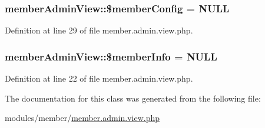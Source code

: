 \hypertarget{classmemberAdminView_acd19132e0c8fd313edebad04734206f9}{}
\subsubsection[{\$member\+Config}]{\setlength{\rightskip}{0pt plus 5cm}member\+Admin\+View\+::\$member\+Config = N\+U\+L\+L}\label{classmemberAdminView_acd19132e0c8fd313edebad04734206f9}


Definition at line 29 of file member.\+admin.\+view.\+php.

\hypertarget{classmemberAdminView_a4955a7b9bc128c344a2987dd1cb8e043}{}
\subsubsection[{\$member\+Info}]{\setlength{\rightskip}{0pt plus 5cm}member\+Admin\+View\+::\$member\+Info = N\+U\+L\+L}\label{classmemberAdminView_a4955a7b9bc128c344a2987dd1cb8e043}


Definition at line 22 of file member.\+admin.\+view.\+php.



The documentation for this class was generated from the following file\+:\begin{DoxyCompactItemize}
\item 
modules/member/\hyperlink{member_8admin_8view_8php}{member.\+admin.\+view.\+php}\end{DoxyCompactItemize}
